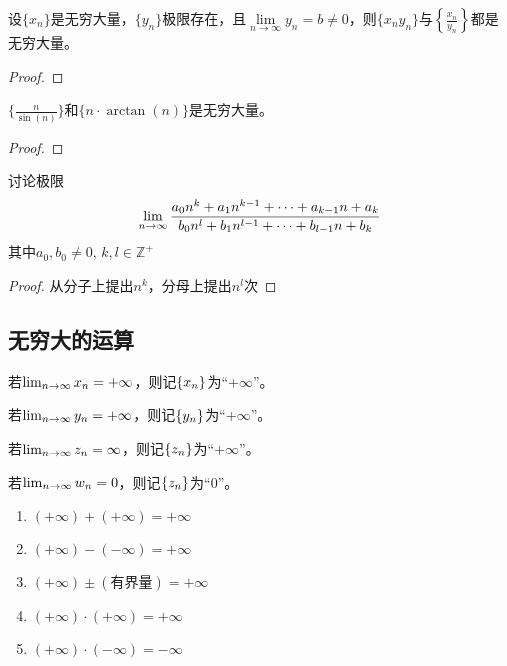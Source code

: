 \begin{lemma}
    设$\{ x_n \}$是无穷大量，$\{ y_n \}$极限存在，且$\lim\limits_{n \to \infty}y_n = b \ne 0$，则$\{ x_n y_n\}$与$\left\{ \frac{x_n}{y_n} \right\}$都是无穷大量。
\end{lemma}
\begin{proof}
\end{proof}

\begin{proposition}
    $\{ \frac{n}{\sin(n)}\}$和$\{ n \cdot \arctan(n)\}$是无穷大量。
\end{proposition}
\begin{proof}
\end{proof}

\begin{proposition}
    讨论极限
    \[ \lim_{n \to \infty} \frac{a_0 n^k + a_1 n^{k - 1} + \cdots + a_{k - 1} n + a_k}{b_0 n^l + b_1 n^{l - 1} + \cdots + b_{l - 1} n + b_k}\]
    其中$a_0, b_0 \ne 0$, $k, l \in \mathbb{Z}^+$
\end{proposition}
\begin{proof}
    从分子上提出$n^k$，分母上提出$n^l$次
\end{proof}
\subsection{无穷大的运算}
若$\lim_{n \to \infty } x_n = +\infty$，则记$\left\{ x_n\right\}$为``+$\infty$''。

若$\lim_{n \to \infty } y_n = +\infty$，则记$\left\{ y_n\right\}$为``+$\infty$''。

若$\lim_{n \to \infty } z_n = \infty$，则记$\left\{ z_n\right\}$为``+$\infty$''。

若$\lim_{n \to \infty } w_n = 0$，则记$\left\{ z_n\right\}$为``0''。
\begin{theorem}
    \begin{enumerate}
        \item $(+\infty) + (+\infty) = +\infty$
        \item $(+\infty) - (-\infty) = +\infty$
        \item $(+\infty) \pm (\text{有界量}) = +\infty$
        \item $(+\infty) \cdot (+\infty) = +\infty$
        \item $(+\infty) \cdot (-\infty) = -\infty$
    \end{enumerate}
\end{theorem}

